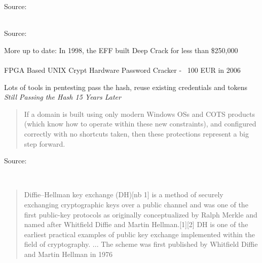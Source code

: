 \documentclass[Screen16to9,17pt]{foils}
\begin{document}
Source:\\
\\




Source: 

{\small
More up to date:  In 1998, the EFF built Deep Crack for less than \$250,000\\
\\
FPGA Based UNIX Crypt Hardware Password Cracker - ~100 EUR in 2006\\
}


Lots of tools in pentesting pass the hash, reuse existing credentials and tokens
\emph{Still Passing the Hash 15 Years Later}\\

\begin{quote}
If a domain is built using only modern Windows OSs and COTS products (which know how to operate within these new constraints), and configured correctly with no shortcuts taken, then these protections represent a big step forward.
\end{quote}

Source:\\
{\small{}
}



{~}

\begin{quote}
Diffie–Hellman key exchange (DH)[nb 1] is a method of securely exchanging cryptographic keys over a public channel and was one of the first public-key protocols as originally conceptualized by Ralph Merkle and named after Whitfield Diffie and Martin Hellman.[1][2] DH is one of the earliest practical examples of public key exchange implemented within the field of cryptography.
... The scheme was first published by Whitfield Diffie and Martin Hellman in 1976
\end{quote}
\end{document}
